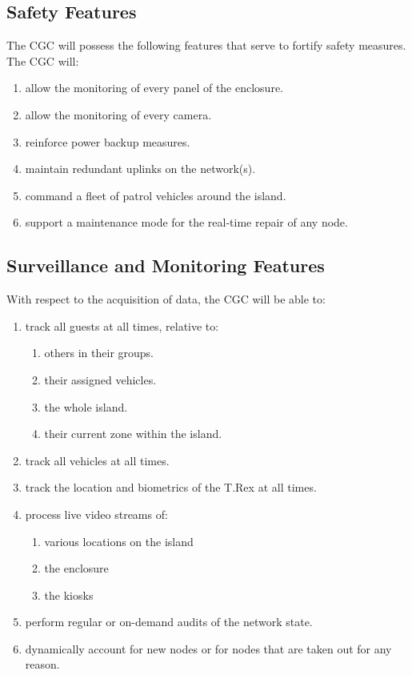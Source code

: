 \documentclass[12pt]{article}
\begin{document}
	\subsection{Safety Features} The CGC will possess the following features that 
	serve to fortify safety measures. The CGC will:
	\begin{enumerate}
		\item allow the monitoring of every panel of the enclosure.
		\item allow the monitoring of every camera.
		\item reinforce power backup measures.
		\item maintain redundant uplinks on the network(s).
		\item command a fleet of patrol vehicles around the island.
		\item support a maintenance mode for the real-time repair of any node.
	\end{enumerate}
	
	\subsection{Surveillance and Monitoring Features} With respect to the acquisition of 
	data, the CGC will be able to:
	\begin{enumerate}
		\item track all guests at all times, relative to:
			\begin{enumerate}
				\item others in their groups.
				\item their assigned vehicles.
				\item the whole island.
				\item their current zone within the island.
			\end{enumerate}
		\item track all vehicles at all times.
		\item track the location and biometrics of the T.Rex at all times.
		\item process live video streams of:
		    \begin{enumerate}
		        \item various locations on the island
		        \item the enclosure
		        \item the kiosks
		    \end{enumerate}
		\item perform regular or on-demand audits of the network state.
		\item dynamically account for new nodes or for nodes that are
		taken out for any reason.
	\end{enumerate}
	
\end{document}
